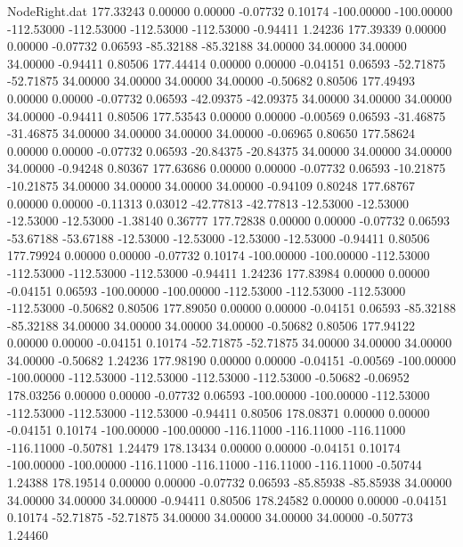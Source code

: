 \begin{filecontents}{NodeRight.dat}
 177.33243    0.00000    0.00000    -0.07732    0.10174 -100.00000 -100.00000 -112.53000 -112.53000 -112.53000 -112.53000   -0.94411    1.24236
 177.39339    0.00000    0.00000    -0.07732    0.06593  -85.32188  -85.32188   34.00000   34.00000   34.00000   34.00000   -0.94411    0.80506
 177.44414    0.00000    0.00000    -0.04151    0.06593  -52.71875  -52.71875   34.00000   34.00000   34.00000   34.00000   -0.50682    0.80506
 177.49493    0.00000    0.00000    -0.07732    0.06593  -42.09375  -42.09375   34.00000   34.00000   34.00000   34.00000   -0.94411    0.80506
 177.53543    0.00000    0.00000    -0.00569    0.06593  -31.46875  -31.46875   34.00000   34.00000   34.00000   34.00000   -0.06965    0.80650
 177.58624    0.00000    0.00000    -0.07732    0.06593  -20.84375  -20.84375   34.00000   34.00000   34.00000   34.00000   -0.94248    0.80367
 177.63686    0.00000    0.00000    -0.07732    0.06593  -10.21875  -10.21875   34.00000   34.00000   34.00000   34.00000   -0.94109    0.80248
 177.68767    0.00000    0.00000    -0.11313    0.03012  -42.77813  -42.77813  -12.53000  -12.53000  -12.53000  -12.53000   -1.38140    0.36777
 177.72838    0.00000    0.00000    -0.07732    0.06593  -53.67188  -53.67188  -12.53000  -12.53000  -12.53000  -12.53000   -0.94411    0.80506
 177.79924    0.00000    0.00000    -0.07732    0.10174 -100.00000 -100.00000 -112.53000 -112.53000 -112.53000 -112.53000   -0.94411    1.24236
 177.83984    0.00000    0.00000    -0.04151    0.06593 -100.00000 -100.00000 -112.53000 -112.53000 -112.53000 -112.53000   -0.50682    0.80506
 177.89050    0.00000    0.00000    -0.04151    0.06593  -85.32188  -85.32188   34.00000   34.00000   34.00000   34.00000   -0.50682    0.80506
 177.94122    0.00000    0.00000    -0.04151    0.10174  -52.71875  -52.71875   34.00000   34.00000   34.00000   34.00000   -0.50682    1.24236
 177.98190    0.00000    0.00000    -0.04151   -0.00569 -100.00000 -100.00000 -112.53000 -112.53000 -112.53000 -112.53000   -0.50682   -0.06952
 178.03256    0.00000    0.00000    -0.07732    0.06593 -100.00000 -100.00000 -112.53000 -112.53000 -112.53000 -112.53000   -0.94411    0.80506
 178.08371    0.00000    0.00000    -0.04151    0.10174 -100.00000 -100.00000 -116.11000 -116.11000 -116.11000 -116.11000   -0.50781    1.24479
 178.13434    0.00000    0.00000    -0.04151    0.10174 -100.00000 -100.00000 -116.11000 -116.11000 -116.11000 -116.11000   -0.50744    1.24388
 178.19514    0.00000    0.00000    -0.07732    0.06593  -85.85938  -85.85938   34.00000   34.00000   34.00000   34.00000   -0.94411    0.80506
 178.24582    0.00000    0.00000    -0.04151    0.10174  -52.71875  -52.71875   34.00000   34.00000   34.00000   34.00000   -0.50773    1.24460

\end{filecontents}

